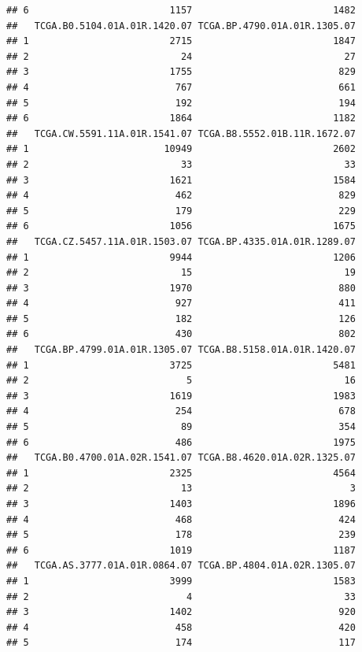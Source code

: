 \documentclass[
]{article}
\begin{document}
\begin{verbatim}
## 6                         1157                         1482
##   TCGA.B0.5104.01A.01R.1420.07 TCGA.BP.4790.01A.01R.1305.07
## 1                         2715                         1847
## 2                           24                           27
## 3                         1755                          829
## 4                          767                          661
## 5                          192                          194
## 6                         1864                         1182
##   TCGA.CW.5591.11A.01R.1541.07 TCGA.B8.5552.01B.11R.1672.07
## 1                        10949                         2602
## 2                           33                           33
## 3                         1621                         1584
## 4                          462                          829
## 5                          179                          229
## 6                         1056                         1675
##   TCGA.CZ.5457.11A.01R.1503.07 TCGA.BP.4335.01A.01R.1289.07
## 1                         9944                         1206
## 2                           15                           19
## 3                         1970                          880
## 4                          927                          411
## 5                          182                          126
## 6                          430                          802
##   TCGA.BP.4799.01A.01R.1305.07 TCGA.B8.5158.01A.01R.1420.07
## 1                         3725                         5481
## 2                            5                           16
## 3                         1619                         1983
## 4                          254                          678
## 5                           89                          354
## 6                          486                         1975
##   TCGA.B0.4700.01A.02R.1541.07 TCGA.B8.4620.01A.02R.1325.07
## 1                         2325                         4564
## 2                           13                            3
## 3                         1403                         1896
## 4                          468                          424
## 5                          178                          239
## 6                         1019                         1187
##   TCGA.AS.3777.01A.01R.0864.07 TCGA.BP.4804.01A.02R.1305.07
## 1                         3999                         1583
## 2                            4                           33
## 3                         1402                          920
## 4                          458                          420
## 5                          174                          117

\end{verbatim}
\end{document}
